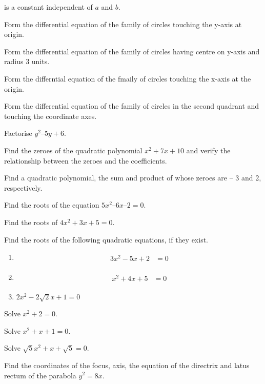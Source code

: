 %
is a constant independent of $a$ and $b$.
%
\item Form the differential equation of the family of circles touching the y-axis at origin.
\item Form the differential equation of the family of circles having centre on y-axis and radius 3 units.
\item Form the differntial equation of the fmaily of circles touching the x-axis at the origin.
%
\item Form the differential equation of the family of circles in the second quadrant and touching the coordinate axes.
\item Factorise $y^2 – 5y + 6$.
\item Find the zeroes of the quadratic polynomial $x^2+7x+10$ and verify the relationship between the zeroes and the coefficients.


\item Find a quadratic polynomial, the sum and product of whose zeroes are – 3 and 2, respectively.
\\
\solution

%
\item Find the roots of the equation $5x^2  – 6x – 2 = 0 $.
\item Find the roots of $4x^2 + 3x + 5 = 0 $.
\item Find the roots of the following quadratic equations, if they exist.
\begin{enumerate}
    \item
    \begin{align}
    \begin{split}
    3x^2-5x+2&=0 \label{quad/2/23/1.0.1}
    \end{split}
    \end{align}
    \item
    \begin{align}
    \begin{split}
    x^2+4x+5&=0 \label{quad/2/23/1.0.2}
    \end{split}
    \end{align}
    \item 	$2x^2-2\sqrt{2}x+1 = 0$
\end{enumerate}
%
\solution
\begin{enumerate}

\end{enumerate}

\item Solve $x^2+ 2 = 0 $.
\\
\solution

\item Solve $x^2+ x+1 = 0 $.
\item Solve $\sqrt{5}x^2+ x+\sqrt{5} = 0 $.
%
\item Find the coordinates of the focus, axis, the equation of the directrix and latus rectum of the parabola $y^2 = 8x$.
%

